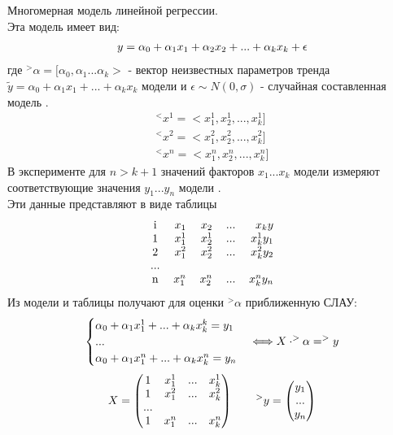 \documentclass[__main__.tex]{subfiles}
\begin{document}
Многомерная модель линейной регрессии.\\
Эта модель имеет вид:
\begin{gather}
\llabel{9:1}
y = \alpha_0+\alpha_1x_1 + \alpha_2x_2 + ... + \alpha_kx_k + \epsilon
\end{gather}
где $^>\alpha = [\alpha_0,\alpha_1...\alpha_k>$ - вектор неизвестных параметров тренда $\widetilde{y} = \alpha_0 + \alpha_1x_1+...+\alpha_kx_k$ модели  и $\epsilon \sim N(0,\sigma)$ - случайная составленная модель .\\

\begin{gather}
^<x^1 = <x_1^1,x_2^1,...,x_k^1]\\
^<x^2 = <x_1^2,x_2^2,...,x_k^2]\\
^<x^n = <x_1^n,x_2^n,...,x_k^n]
\end{gather}
В эксперименте для $n>k+1$ значений факторов $x_1...x_k$ модели  измеряют соответствующие значения $y_1...y_n$ модели .\\
Эти данные представляют в виде таблицы
\begin{gather}
\llabel{9:2}
\begin{tabular}{crrrr}
i & $x_1$ & $x_2$ & ... &$x_ky$\\
1 & $x_1^1$ & $x_2^1$ & ... & $x_k^1y_1$\\
2 & $x_1^2$ & $x_2^2$ & ... & $x_k^2y_2$\\
...\\
n & $x_1^n$ & $x_2^n$ & ... & $x_k^ny_n$\\
\end{tabular}
\end{gather}
Из модели  и таблицы  получают для оценки $^>\alpha$ приближенную СЛАУ:\\
\begin{gather}
\llabel{9:6}
\begin{cases}
\alpha_0+\alpha_1x_1^1+...+\alpha_kx_k^k = y_1\\
...\\
\alpha_0+\alpha_1x_1^n+...+\alpha_kx_k^n = y_n\\
\end{cases}
\Longleftrightarrow X\cdot ^>\alpha = ^>y\\
\end{gather}
\begin{gather}
\llabel{9:3}
X = 
\begin{pmatrix}
1 & x_1^1 & ... & x_k^1\\
1 & x_1^2 & ... & x_k^2\\
...\\
1 & x_1^n & ... & x_k^n
\end{pmatrix}
\qquad ^>y = \begin{pmatrix}
y_1\\
...\\
y_n
\end{pmatrix}
\end{gather}
\end{document}
